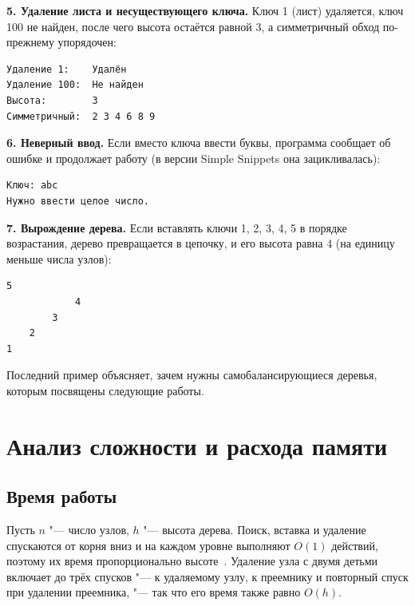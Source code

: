 \documentclass[otchet]{SCWorks}
\begin{document}
\textbf{5. Удаление листа и несуществующего ключа.} Ключ 1 (лист)
удаляется, ключ 100 не найден, после чего высота остаётся равной 3, а
симметричный обход по-прежнему упорядочен:

\begin{Verbatim}[fontsize=\small]
Удаление 1:    Удалён
Удаление 100:  Не найден
Высота:        3
Симметричный:  2 3 4 6 8 9
\end{Verbatim}

\textbf{6. Неверный ввод.} Если вместо ключа ввести буквы, программа
сообщает об ошибке и продолжает работу (в версии Simple Snippets она
зацикливалась):

\begin{Verbatim}[fontsize=\small]
Ключ: abc
Нужно ввести целое число.
\end{Verbatim}

\textbf{7. Вырождение дерева.} Если вставлять ключи 1, 2, 3, 4, 5 в
порядке возрастания, дерево превращается в цепочку, и его высота равна 4
(на единицу меньше числа узлов):

\begin{Verbatim}[fontsize=\small]
                5
            4
        3
    2
1
\end{Verbatim}

Последний пример объясняет, зачем нужны самобалансирующиеся деревья,
которым посвящены следующие работы.


\section{Анализ сложности и расхода памяти}
\label{sec:analysis}

\subsection{Время работы}

Пусть $n$ "--- число узлов, $h$ "--- высота дерева. Поиск, вставка и
удаление спускаются от корня вниз и на каждом уровне выполняют
$O(1)$ действий, поэтому их время пропорционально высоте~\cite{kormen}.
Удаление узла с двумя детьми включает до трёх спусков "--- к удаляемому узлу,
к преемнику и повторный спуск при удалении преемника, "--- так что его
время также равно $O(h)$.
\end{document}
